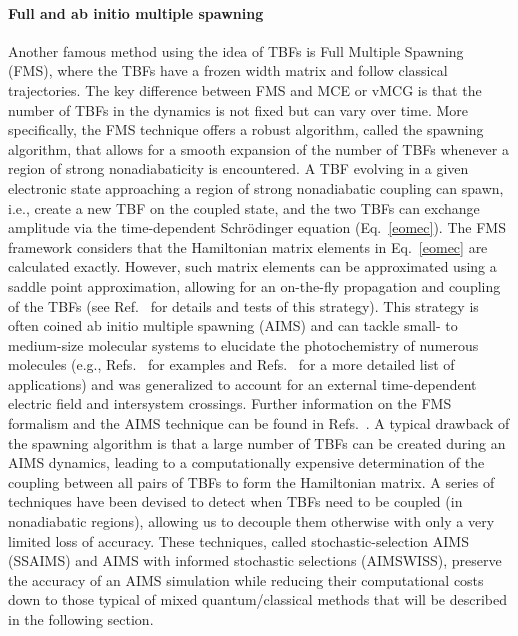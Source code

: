 \documentclass[9pt,bestpractices,pubversion]{livecoms}
\begin{document}
\paragraph{Full and ab initio multiple spawning}
Another famous method using the idea of TBFs is Full Multiple Spawning (FMS),\cite{martinez1996multi,martinez1997non,Ben-Nun1998,ben-nun00,hack2001comparison,toddaims,virshup2008photodynamics,curchod2018ab} where the TBFs have a frozen width matrix and follow classical trajectories. The key difference between FMS and MCE or vMCG is that the number of TBFs in the dynamics is not fixed but can vary over time. More specifically, the FMS technique offers a robust algorithm, called the spawning algorithm, that allows for a smooth expansion of the number of TBFs whenever a region of strong nonadiabaticity is encountered.\cite{yang2009optimal,levine2007isomerization,toddaims,curchod2018ab} A TBF evolving in a given electronic state approaching a region of strong nonadiabatic coupling can spawn, i.e., create a new TBF on the coupled state, and the two TBFs can exchange amplitude via the time-dependent Schr\"{o}dinger equation (Eq.~\eqref{eomec}). The FMS framework considers that the Hamiltonian matrix elements in Eq.~\eqref{eomec} are calculated exactly. However, such matrix elements can be approximated using a saddle point approximation, allowing for an on-the-fly propagation and coupling of the TBFs (see Ref.~ for details and tests of this strategy). This strategy is often coined ab initio multiple spawning (AIMS) and can tackle small- to medium-size molecular systems to elucidate the photochemistry of numerous molecules (e.g., Refs.~\cite{tao2011ultrafast,mignolet2016rich,snyder2016gpu,pijeau2017excited,li2017ultrafast,glover2018excited,yang2018imaging,coates2018vacuum} for examples and Refs.~\cite{persico2014overview,curchod2018ab} for a more detailed list of applications) and was generalized to account for an external time-dependent electric field\cite{mignolet2016communication,mignolet2019excited} and intersystem crossings.\cite{curchod2016communication,fedorov2018predicting,fedorov2016ab,varganovGAIMS2021} Further information on the FMS formalism and the AIMS technique can be found in Refs.~. A typical drawback of the spawning algorithm is that a large number of TBFs can be created during an AIMS dynamics, leading to a computationally expensive determination of the coupling between all pairs of TBFs to form the Hamiltonian matrix. A series of techniques have been devised to detect when TBFs need to be coupled (in nonadiabatic regions), allowing us to decouple them otherwise with only a very limited loss of accuracy. These techniques, called stochastic-selection AIMS (SSAIMS)\cite{curchod2020ssaims,ibele2021ssaims} and AIMS with informed stochastic selections (AIMSWISS),\cite{lassmann2021aimswiss,lassmann2022extending} preserve the accuracy of an AIMS simulation while reducing their computational costs down to those typical of mixed quantum/classical methods that will be described in the following section.   
\end{document}
